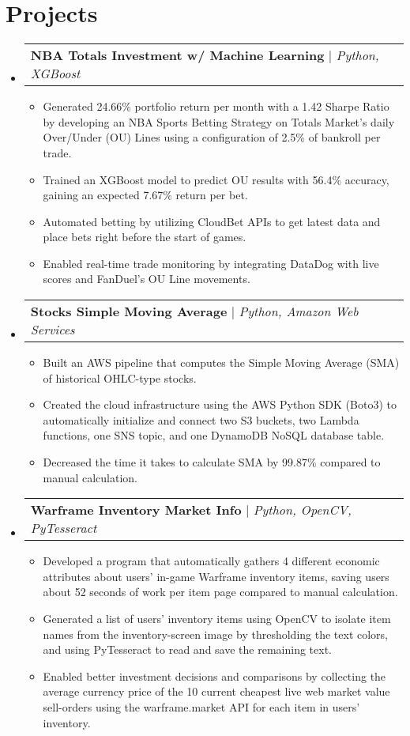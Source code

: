 \documentclass[letterpaper,11pt]{article}
\makeatletter
\newcommand{\resumeItem}[1]{
  \item\small{
    {#1 \vspace{-2pt}}
  }
}
\newcommand{\resumeProjectHeading}[2]{
    \item
    \begin{tabular*}{0.97\textwidth}{l@{\extracolsep{\fill}}r}
      \small#1 & #2 \\
    \end{tabular*}\vspace{-7pt}
}
\newcommand{\resumeSubHeadingListStart}{\begin{itemize}[leftmargin=0.15in, label={}]}
\newcommand{\resumeSubHeadingListEnd}{\end{itemize}}
\newcommand{\resumeItemListStart}{\begin{itemize}}
\newcommand{\resumeItemListEnd}{\end{itemize}\vspace{-5pt}}
\makeatother
\begin{document}
\section{Projects}
    \resumeSubHeadingListStart
      \resumeProjectHeading
          {\textbf{NBA Totals Investment w/ Machine Learning} $|$ \emph{Python, XGBoost}}{}
          \resumeItemListStart
            \resumeItem{Generated 24.66\% portfolio return per month with a 1.42 Sharpe Ratio by developing an NBA Sports Betting Strategy on Totals Market's daily Over/Under (OU) Lines using a configuration of 2.5\% of bankroll per trade.}
            \resumeItem{Trained an XGBoost model to predict OU results with 56.4\% accuracy, gaining an expected 7.67\% return per bet.}
            \resumeItem{Automated betting by utilizing CloudBet APIs to get latest data and place bets right before the start of games.}
            \resumeItem{Enabled real-time trade monitoring by integrating DataDog with live scores and FanDuel's OU Line movements.}
          \resumeItemListEnd
      \resumeProjectHeading
          {\textbf{Stocks Simple Moving Average} $|$ \emph{Python, Amazon Web Services}}{}
          \resumeItemListStart
            \resumeItem{Built an AWS pipeline that computes the Simple Moving Average (SMA) of historical OHLC-type stocks.}
            \resumeItem{Created the cloud infrastructure using the AWS Python SDK (Boto3) to automatically initialize and connect two S3 buckets, two Lambda functions, one SNS topic, and one DynamoDB NoSQL database table.}
            \resumeItem{Decreased the time it takes to calculate SMA by 99.87\% compared to manual calculation.}
          \resumeItemListEnd
      \resumeProjectHeading
          {\textbf{Warframe Inventory Market Info} $|$ \emph{Python, OpenCV, PyTesseract}}{}
          \resumeItemListStart
            \resumeItem{Developed a program that automatically gathers 4 different economic attributes about users’ in-game Warframe inventory items, saving users about 52 seconds of work per item page compared to manual calculation.}
            \resumeItem{Generated a list of users' inventory items using OpenCV to isolate item names from the inventory-screen image by thresholding the text colors, and using PyTesseract to read and save the remaining text.}
            \resumeItem{Enabled better investment decisions and comparisons by collecting the average currency price of the 10 current cheapest live web market value sell-orders using the warframe.market API for each item in users' inventory.}
          \resumeItemListEnd
    \resumeSubHeadingListEnd


\end{document}
